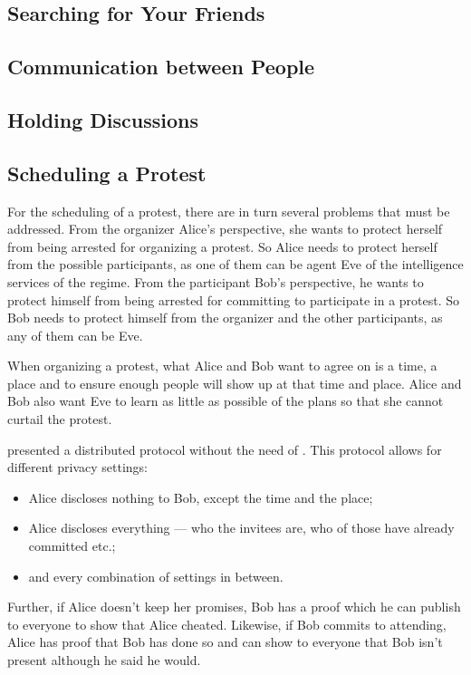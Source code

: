 \subsection{Searching for Your Friends}
\label{UserSearch}



%

\subsection{Communication between People}
\label{Communicating}



\subsection{Holding Discussions}
\label{Discussions}



\subsection{Scheduling a Protest}
\label{Scheduling}

For the scheduling of a protest, there are in turn several problems that must 
be addressed.
From the organizer Alice's perspective, she wants to protect herself from being 
arrested for organizing a protest.
So Alice needs to protect herself from the possible participants, as one of 
them can be agent Eve of the intelligence services of the regime.
From the participant Bob's perspective, he wants to protect himself from being 
arrested for committing to participate in a protest.
So Bob needs to protect himself from the organizer and the other participants, 
as any of them can be Eve.

When organizing a protest, what Alice and Bob want to agree on is a time, 
a place and to ensure enough people will show up at that time and place.
Alice and Bob also want Eve to learn as little as possible of the plans so 
that she cannot curtail the protest.

\citet{EventsInvitations} presented a distributed protocol without the need of 
.
This protocol allows for different privacy settings:
\begin{itemize}
\item Alice discloses nothing to Bob, except the time and the place;
\item Alice discloses everything --- who the invitees are, who of those have 
  already committed etc.;
\item and every combination of settings in between.
\end{itemize}
Further, if Alice doesn't keep her promises, Bob has a proof which he can 
publish to everyone to show that Alice cheated.
Likewise, if Bob commits to attending, Alice has proof that Bob has done so and 
can show to everyone that Bob isn't present although he said he would.

